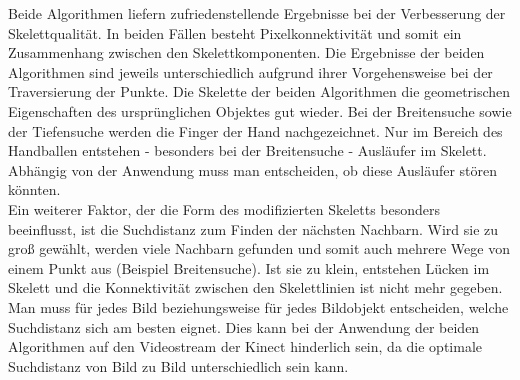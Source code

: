 Beide Algorithmen liefern zufriedenstellende Ergebnisse bei der Verbesserung der Skelettqualität. In beiden
Fällen besteht Pixelkonnektivität und somit ein Zusammenhang zwischen den Skelettkomponenten. Die Ergebnisse
der beiden Algorithmen sind jeweils unterschiedlich aufgrund ihrer Vorgehensweise bei der Traversierung der Punkte. Die Skelette der beiden Algorithmen die geometrischen Eigenschaften des ursprünglichen Objektes gut wieder. Bei der Breitensuche sowie der Tiefensuche werden die Finger der Hand
nachgezeichnet. Nur im Bereich des Handballen entstehen - besonders bei der Breitensuche - Ausläufer im Skelett. Abhängig von der Anwendung muss man entscheiden, ob diese Ausläufer stören könnten.\\
Ein weiterer Faktor, der die Form des modifizierten Skeletts besonders beeinflusst, ist die Suchdistanz zum
Finden der nächsten Nachbarn. Wird sie zu groß gewählt, werden viele Nachbarn gefunden und somit auch
mehrere Wege von einem Punkt aus (Beispiel Breitensuche). Ist sie zu klein, entstehen Lücken im Skelett
und die Konnektivität zwischen den Skelettlinien ist nicht mehr gegeben. Man muss für jedes Bild beziehungsweise für jedes Bildobjekt entscheiden, welche Suchdistanz sich am besten eignet. Dies kann
bei der Anwendung der beiden Algorithmen auf den Videostream der Kinect hinderlich sein, da die optimale Suchdistanz von Bild zu Bild unterschiedlich sein kann.
